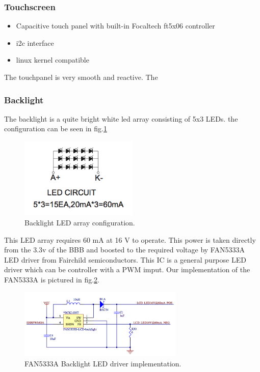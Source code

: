 \subsubsection{Touchscreen}

\begin{itemize}
  \item {Capacitive touch panel with built-in Focaltech ft5x06 controller}
  \item {i2c interface}
  \item {linux kernel compatible}
\end{itemize}
The touchpanel is very smooth and reactive. The
\subsubsection{Backlight}
The backlight is a quite bright white led array consisting of 5x3 LEDs. the configuration can be seen in fig.\ref{fig:backlight_led}

\begin{figure}[!htb]
    \centering
    \includegraphics[width=0.5\textwidth,keepaspectratio]{chap/hardfig/backlight_led_circuit}
    \caption{Backlight LED array configuration.}
    \label{fig:backlight_led}
\end{figure}

This LED array requires 60 mA at 16 V to operate. This power is taken directly from the 3.3v of the BBB and boosted to the required voltage by FAN5333A LED driver from Fairchild semiconductors.
This IC is a general purpose LED driver which can be controller with a PWM imput.
Our implementation of the FAN5333A is pictured in fig.\ref{fig:backlight driver schematics}.

\begin{figure}[!htb]
    \centering
    \includegraphics[width=0.7\textwidth,keepaspectratio]{chap/hardfig/backlight_led_driver_sch}
    \caption{FAN5333A Backlight LED driver implementation.}
    \label{fig:backlight driver schematics}
\end{figure}

